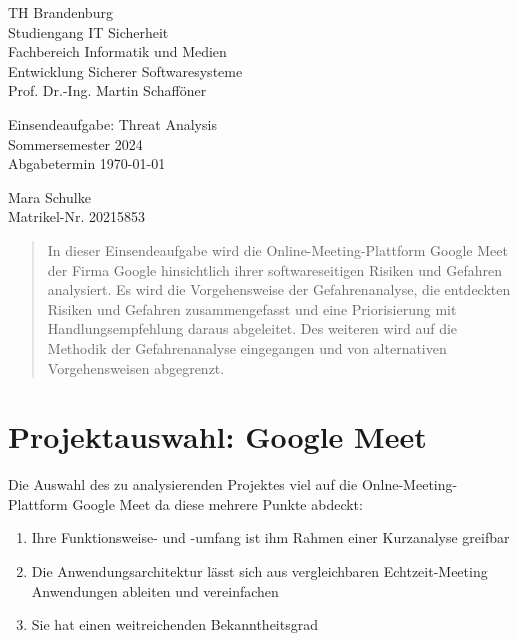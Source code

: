 \documentclass{article}
\begin{document}
\begin{titlepage}
	\begin{flushleft}
		TH Brandenburg \\
		Studiengang IT Sicherheit \\
		Fachbereich Informatik und Medien \\
		Entwicklung Sicherer Softwaresysteme \\
		Prof. Dr.-Ing. Martin Schafföner
	\end{flushleft}

	\vfill

	\begin{center}
		\Large{Einsendeaufgabe: Threat Analysis}\\[0.5em]
		\large{Sommersemester 2024}\\[0.25em]
		\large{Abgabetermin \today}
	\end{center}

	\vfill

	\begin{flushright}
		Mara Schulke \\
		Matrikel-Nr. 20215853
	\end{flushright}
\end{titlepage}

\begin{abstract}
	In dieser Einsendeaufgabe wird die Online-Meeting-Plattform Google Meet der Firma 
	Google hinsichtlich ihrer softwareseitigen Risiken und Gefahren analysiert.
	Es wird die Vorgehensweise der Gefahrenanalyse, die entdeckten Risiken und Gefahren 
	zusammengefasst und eine Priorisierung mit Handlungsempfehlung daraus abgeleitet. Des 
	weiteren wird auf die Methodik der Gefahrenanalyse eingegangen und von alternativen 
	Vorgehensweisen abgegrenzt.
\end{abstract}

\tableofcontents

\listoffigures

\newpage

\section{Projektauswahl: Google Meet}

Die Auswahl des zu analysierenden Projektes viel auf die Onlne-Meeting-Plattform Google 
Meet da diese mehrere Punkte abdeckt:

\begin{enumerate}
	\item Ihre Funktionsweise- und -umfang ist ihm Rahmen einer Kurzanalyse greifbar
	\item Die Anwendungsarchitektur lässt sich aus vergleichbaren Echtzeit-Meeting Anwendungen ableiten und vereinfachen
	\item Sie hat einen weitreichenden Bekanntheitsgrad
\end{enumerate}
\end{document}
